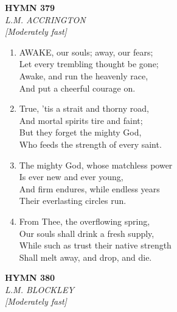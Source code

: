 \newpage
\begin{center}
    {\Large \textbf{HYMN 379}}
    \\
    \textit{L.M. ACCRINGTON}
    \\
    \textit{\small [Moderately fast]}
\end{center}
\vspace{1em}

\begin{enumerate}
    \item AWAKE, our souls; away, our fears; \\
        Let every trembling thought be gone; \\
        Awake, and run the heavenly race, \\
        And put a cheerful courage on.

    \item True, 'tis a strait and thorny road, \\
        And mortal spirits tire and faint; \\
        But they forget the mighty God, \\
        Who feeds the strength of every saint.

    \item The mighty God, whose matchless power \\
        Is ever new and ever young, \\
        And firm endures, while endless years \\
        Their everlasting circles run.

    \item From Thee, the overflowing spring, \\
        Our souls shall drink a fresh supply, \\
        While such as trust their native strength \\
        Shall melt away, and drop, and die.

\end{enumerate}

\newpage
\begin{center}
    {\Large \textbf{HYMN 380}}
    \\
    \textit{L.M. BLOCKLEY}
    \\
    \textit{\small [Moderately fast]}
\end{center}
\vspace{1em}

